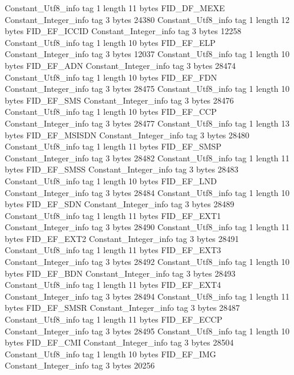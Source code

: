 {{{		}
		Constant_Utf8_info {
			tag	1
			length	11
			bytes	FID_DF_MEXE
		}
		Constant_Integer_info {
			tag	3
			bytes	24380
		}
		Constant_Utf8_info {
			tag	1
			length	12
			bytes	FID_EF_ICCID
		}
		Constant_Integer_info {
			tag	3
			bytes	12258
		}
		Constant_Utf8_info {
			tag	1
			length	10
			bytes	FID_EF_ELP
		}
		Constant_Integer_info {
			tag	3
			bytes	12037
		}
		Constant_Utf8_info {
			tag	1
			length	10
			bytes	FID_EF_ADN
		}
		Constant_Integer_info {
			tag	3
			bytes	28474
		}
		Constant_Utf8_info {
			tag	1
			length	10
			bytes	FID_EF_FDN
		}
		Constant_Integer_info {
			tag	3
			bytes	28475
		}
		Constant_Utf8_info {
			tag	1
			length	10
			bytes	FID_EF_SMS
		}
		Constant_Integer_info {
			tag	3
			bytes	28476
		}
		Constant_Utf8_info {
			tag	1
			length	10
			bytes	FID_EF_CCP
		}
		Constant_Integer_info {
			tag	3
			bytes	28477
		}
		Constant_Utf8_info {
			tag	1
			length	13
			bytes	FID_EF_MSISDN
		}
		Constant_Integer_info {
			tag	3
			bytes	28480
		}
		Constant_Utf8_info {
			tag	1
			length	11
			bytes	FID_EF_SMSP
		}
		Constant_Integer_info {
			tag	3
			bytes	28482
		}
		Constant_Utf8_info {
			tag	1
			length	11
			bytes	FID_EF_SMSS
		}
		Constant_Integer_info {
			tag	3
			bytes	28483
		}
		Constant_Utf8_info {
			tag	1
			length	10
			bytes	FID_EF_LND
		}
		Constant_Integer_info {
			tag	3
			bytes	28484
		}
		Constant_Utf8_info {
			tag	1
			length	10
			bytes	FID_EF_SDN
		}
		Constant_Integer_info {
			tag	3
			bytes	28489
		}
		Constant_Utf8_info {
			tag	1
			length	11
			bytes	FID_EF_EXT1
		}
		Constant_Integer_info {
			tag	3
			bytes	28490
		}
		Constant_Utf8_info {
			tag	1
			length	11
			bytes	FID_EF_EXT2
		}
		Constant_Integer_info {
			tag	3
			bytes	28491
		}
		Constant_Utf8_info {
			tag	1
			length	11
			bytes	FID_EF_EXT3
		}
		Constant_Integer_info {
			tag	3
			bytes	28492
		}
		Constant_Utf8_info {
			tag	1
			length	10
			bytes	FID_EF_BDN
		}
		Constant_Integer_info {
			tag	3
			bytes	28493
		}
		Constant_Utf8_info {
			tag	1
			length	11
			bytes	FID_EF_EXT4
		}
		Constant_Integer_info {
			tag	3
			bytes	28494
		}
		Constant_Utf8_info {
			tag	1
			length	11
			bytes	FID_EF_SMSR
		}
		Constant_Integer_info {
			tag	3
			bytes	28487
		}
		Constant_Utf8_info {
			tag	1
			length	11
			bytes	FID_EF_ECCP
		}
		Constant_Integer_info {
			tag	3
			bytes	28495
		}
		Constant_Utf8_info {
			tag	1
			length	10
			bytes	FID_EF_CMI
		}
		Constant_Integer_info {
			tag	3
			bytes	28504
		}
		Constant_Utf8_info {
			tag	1
			length	10
			bytes	FID_EF_IMG
		}
		Constant_Integer_info {
			tag	3
			bytes	20256
		}
}}

